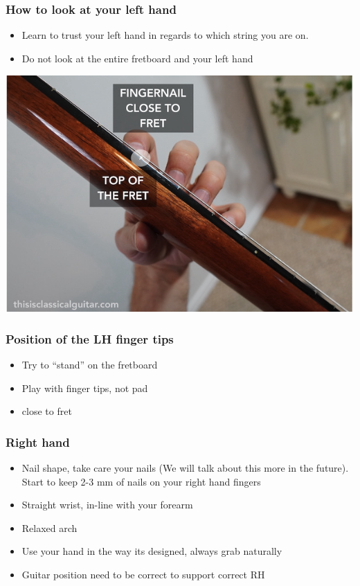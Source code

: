 \documentclass[11pt]{article}
\begin{document}
\subsubsection*{How to look at your left hand}
\label{sec:orgee14996}
\begin{itemize}
\item Learn to trust your left hand in regards to which string you are on.
\item Do not look at the entire fretboard and your left hand
\end{itemize}
\begin{center}
\includegraphics[width=.9\linewidth]{./Handouts.org_20240214_214427.png}
\end{center}
\subsubsection*{Position of the LH finger tips}
\label{sec:orga67f523}
\begin{itemize}
\item Try to ``stand'' on the fretboard
\item Play with finger tips, not pad
\item close to fret
\end{itemize}
\subsubsection*{Right hand}
\label{sec:org5fe5500}
\begin{itemize}
\item Nail shape, take care your nails (We will talk about this more in the future).
Start to keep 2-3 mm of nails on your right hand fingers
\item Straight wrist, in-line with your forearm
\item Relaxed arch
\item Use your hand in the way its designed, always grab naturally
\item Guitar position need to be correct to support correct RH
\end{itemize}
\end{document}
